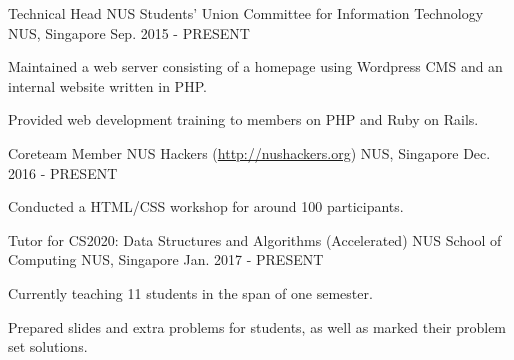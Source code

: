 

\begin{cventries}


	\cventry
	{Technical Head} %
	{NUS Students' Union Committee for Information Technology} %
	{NUS, Singapore} %
	{Sep. 2015 - PRESENT} %
	{ %
		\begin{cvitems}
		\item {Maintained a web server consisting of a homepage using Wordpress CMS and an internal website written in PHP.}
		\item {Provided web development training to members on PHP and Ruby on Rails.}
		\end{cvitems}
	}


	\cventry
	{Coreteam Member} %
	{NUS Hackers (\url{http://nushackers.org})} %
	{NUS, Singapore} %
	{Dec. 2016 - PRESENT} %
	{ %
		\begin{cvitems}
		\item {Conducted a HTML/CSS workshop for around 100 participants.}
		\end{cvitems}
	}


	\cventry
	{Tutor for CS2020: Data Structures and Algorithms (Accelerated)} %
	{NUS School of Computing} %
	{NUS, Singapore} %
	{Jan. 2017 - PRESENT} %
	{ %
		\begin{cvitems}
		\item {Currently teaching 11 students in the span of one semester.}
		\item {Prepared slides and extra problems for students, as well as marked their problem set solutions.}
		\end{cvitems}
	}


\end{cventries}
